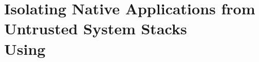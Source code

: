 \declarecommand{\sysname}{\gsgx{}}


\chapter{Isolating Native Applications from Untrusted System Stacks\\ Using \sysname{}}
\label{chap:gsgx}








